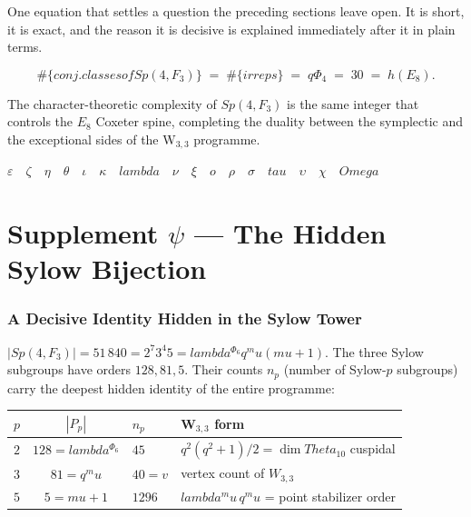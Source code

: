 \documentclass[12pt,a4paper]{article}
\def\mathbb#1{#1}%
\def\mathrm#1{#1}%
\def\text#1{#1}%
\def\lambda{lambda}%
\def\mu{mu}%
\def\Phi#1{Phi#1}%
\def\tau{tau}%
\def\Theta{Theta}%
\def\Omega{Omega}%
\def\cdot{ }%
\theoremstyle{definition}
\newcommand{\Sp}{\mathrm{Sp}}
\newcommand{\FF}{\mathbb{F}}
\begin{document}
\begin{plainbox}
One equation that settles a question the preceding sections leave open. It is short,
it is exact, and the reason it is decisive is explained immediately after it in plain
terms.
\end{plainbox}


\[
\boxed{\;\#\{\text{conj. classes of }\Sp(4,\FF_3)\} \;=\; \#\{\text{irreps}\} \;=\; q\Phi_4 \;=\; 30 \;=\; h(E_8).\;}
\]

The character-theoretic complexity of $\Sp(4,\FF_3)$ is the same
integer that controls the $E_8$ Coxeter spine, completing the
duality between the symplectic and the exceptional sides of the
W$_{3,3}$ programme.

\hfill$\varepsilon\quad\zeta\quad\eta\quad\theta\quad\iota\quad\kappa\quad\lambda\quad\nu\quad\xi\quad o\quad\rho\quad\sigma\quad\tau\quad\upsilon\quad\chi\quad\Omega$

\clearpage
\part*{\texorpdfstring{Supplement $\psi$ --- The Hidden Sylow Bijection}{Supplement psi --- The Hidden Sylow Bijection}}

\section*{A Decisive Identity Hidden in the Sylow Tower}

$|\Sp(4,\FF_3)| = 51\,840 = 2^7\cdot 3^4\cdot 5 = \lambda^{\Phi_6}\cdot q^\mu\cdot(\mu+1)$.
The three Sylow subgroups have orders $128, 81, 5$. Their counts
$n_p$ (number of Sylow-$p$ subgroups) carry the deepest hidden identity
of the entire programme:

\begin{center}
\renewcommand{\arraystretch}{1.4}
\begin{tabular}{ccll}
\toprule
$p$ & $|P_p|$ & $n_p$ & W$_{3,3}$ form \\
\midrule
$2$ & $128 = \lambda^{\Phi_6}$ & $45$  & $q^2(q^2+1)/2 = \dim\Theta_{10}$ cuspidal \\
$3$ & $81  = q^\mu$               & $\boxed{40 = v}$ & vertex count of $W_{3,3}$ \\
$5$ & $5   = \mu+1$               & $1296$  & $\lambda^\mu\,q^\mu$ = point stabilizer order \\
\bottomrule
\end{tabular}
\end{center}
\end{document}
